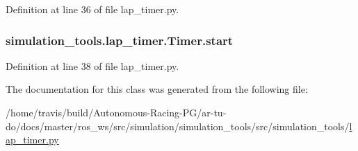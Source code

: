 Definition at line 36 of file lap\+\_\+timer.\+py.

\subsubsection[{\texorpdfstring{start}{start}}]{\setlength{\rightskip}{0pt plus 5cm}simulation\+\_\+tools.\+lap\+\_\+timer.\+Timer.\+start}\hypertarget{classsimulation__tools_1_1lap__timer_1_1_timer_afc51d0e4a6aa0e19be5c8622352b9afe}{}\label{classsimulation__tools_1_1lap__timer_1_1_timer_afc51d0e4a6aa0e19be5c8622352b9afe}


Definition at line 38 of file lap\+\_\+timer.\+py.



The documentation for this class was generated from the following file\+:\begin{DoxyCompactItemize}
\item 
/home/travis/build/\+Autonomous-\/\+Racing-\/\+P\+G/ar-\/tu-\/do/docs/master/ros\+\_\+ws/src/simulation/simulation\+\_\+tools/src/simulation\+\_\+tools/\hyperlink{lap__timer_8py}{lap\+\_\+timer.\+py}\end{DoxyCompactItemize}
